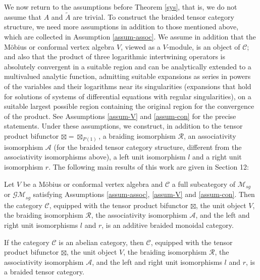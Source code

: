 \documentclass[12pt]{article}
\begin{document}
We now return to the assumptions before Theorem \ref{sys}, that is, we
do not assume that $A$ and $\tilde{A}$ are trivial.  To construct the
braided tensor category structure, we need more assumptions in
addition to those mentioned above, which are collected in Assumption
\ref{assum-assoc}.  We assume in addition that the M\"{o}bius or
conformal vertex algebra $V$, viewed as a $V$-module, is an object of
$\mathcal{C}$; and also that the product of three logarithmic
intertwining operators is absolutely convergent in a suitable region
and can be analytically extended to a multivalued analytic function,
admitting suitable expansions as series in powers of the variables and
their logarithms near its singularities (expansions that hold for
solutions of systems of differential equations with regular
singularities), on a suitable largest possible region containing the
original region for the convergence of the product. See Assumptions
\ref{assum-V} and \ref{assum-con} for the precise statements.  Under
these assumptions, we construct, in addition to the tensor product
bifunctor $\boxtimes=\boxtimes_{P(1)}$, a braiding isomorphism
$\mathcal{R}$, an associativity isomorphism $\mathcal{A}$ (for the
braided tensor category structure, different from the associativity
isomorphisms above), a left unit isomorphism $l$ and a right unit
isomorphism $r$.  The following main results of this work are given in
Section 12:

\setcounter{section}{12}
\setcounter{rema}{14}
\begin{theo}
Let $V$ be a M\"{o}bius or conformal vertex algebra and $\mathcal{C}$
a full subcategory of $\mathcal{M}_{sg}$ or $\mathcal{GM}_{sg}$
satisfying Assumptions \ref{assum-assoc}, \ref{assum-V} and
\ref{assum-con}.  Then the category $\mathcal{C}$, equipped with the
tensor product bifunctor $\boxtimes$, the unit object $V$, the
braiding isomorphism $\mathcal{R}$, the associativity isomorphism
$\mathcal{A}$, and the left and right unit isomorphisms $l$ and $r$,
is an additive braided monoidal category.
\end{theo}

\begin{corol}
If the category $\mathcal{C}$ is an abelian category, then
$\mathcal{C}$, equipped with the tensor product bifunctor $\boxtimes$,
the unit object $V$, the braiding isomorphism $\mathcal{R}$, the
associativity isomorphism $\mathcal{A}$, and the left and right unit
isomorphisms $l$ and $r$, is a braided tensor category.
\end{corol}
\end{document}

